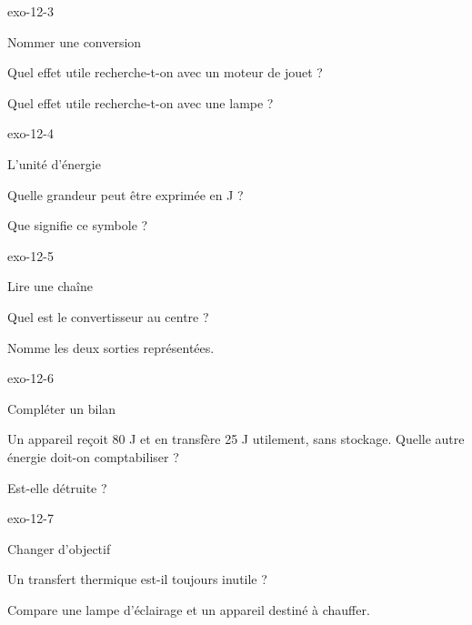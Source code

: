 \documentclass[12pt,twoside,openany]{book}
\begin{document}
\begin{blocLivre}{exo-12-3}
\begin{exercice}[1]{Nommer une conversion}
\begin{questions}
\item Quel effet utile recherche-t-on avec un moteur de jouet ?
\item Quel effet utile recherche-t-on avec une lampe ?
\end{questions}
\end{exercice}\end{blocLivre}
\begin{blocLivre}{exo-12-4}
\begin{exercice}[1]{L’unité d’énergie}
\begin{questions}
\item Quelle grandeur peut être exprimée en J ?
\item Que signifie ce symbole ?
\end{questions}
\end{exercice}\end{blocLivre}
\begin{blocLivre}{exo-12-5}
\begin{exercice}[1]{Lire une chaîne}
\begin{questions}
\item Quel est le convertisseur au centre ?
\item Nomme les deux sorties représentées.
\end{questions}
\end{exercice}\end{blocLivre}
\begin{blocLivre}{exo-12-6}
\begin{exercice}[2]{Compléter un bilan}
\begin{questions}
\item Un appareil reçoit 80 J et en transfère 25 J utilement, sans stockage. Quelle autre énergie doit-on comptabiliser ?
\item Est-elle détruite ?
\end{questions}
\end{exercice}\end{blocLivre}
\begin{blocLivre}{exo-12-7}
\begin{exercice}[2]{Changer d’objectif}
\begin{questions}
\item Un transfert thermique est-il toujours inutile ?
\item Compare une lampe d’éclairage et un appareil destiné à chauffer.
\end{questions}
\end{exercice}\end{blocLivre}
\end{document}
